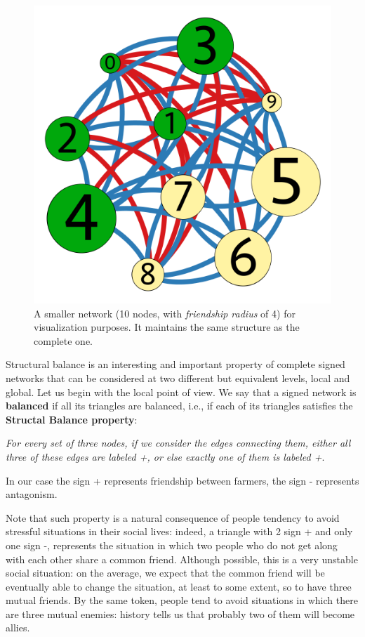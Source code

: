 \documentclass{report}
\theoremstyle{definition}
\theoremstyle{remark}
\begin{document}
\begin{figure} [h]
	\centering
	\includegraphics [scale = 0.3]{farmers_reduced.png}
	\caption{A smaller network (10 nodes, with \textit{friendship radius} of 4) for visualization purposes. It maintains the same structure as the complete one.}  \label{fig:10farmers}
\end{figure}

\newpage
Structural balance is an interesting and important property of complete signed networks that can be considered at two different but equivalent levels, local and global. Let us begin with the local point of view. We say that a signed network is \textbf{balanced} if all its triangles are balanced, i.e., if each of its triangles satisfies the \textbf{Structal Balance property}:
\bigskip

\textit{For every set of three nodes, if we consider the edges connecting them, either all three of these edges are labeled +, or else exactly one of them is labeled +}.
\bigskip


In our case the sign + represents friendship between farmers, the sign - represents antagonism.

Note that such property is a natural consequence of people tendency to avoid stressful situations in their social lives: indeed, a triangle with 2 sign + and only one sign -, represents the situation in which two people who do not get along with each other share a common friend. Although possible, this is a very unstable social situation: on the average, we expect that the common friend will be eventually able to change the situation, at least to some extent, so to have three mutual friends. By the same token, people tend to avoid situations in which there are three mutual enemies: history tells us that probably two of them will become allies.
\end{document}
